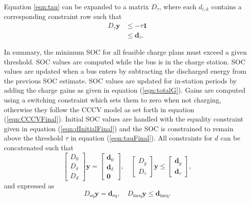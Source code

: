 Equation \eqref{eqn:tau} can be expanded to a matrix $D_\tau$, where each $d_{i,k}$ contains a corresponding constraint row such that
\begin{equation}\label{eqn:tauFinal}
	\begin{aligned}
		D_\tau\mathbf{y} & \le -\tau\mathbf{1} \\
		       & \le \mathbf{d}_\tau.
	\end{aligned}
\end{equation}
\par In summary, the minimum SOC for all feasible charge plans must exceed a given threshold.  SOC values are computed while the bus is in
the charge station.  SOC values are updated when a bus enters by
subtracting the discharged energy from the previous SOC estimate. SOC
values are updated for in-station periods by adding the charge gains
as given in equation (\ref{eqn:totalG}).  Gains are computed using a
switching constraint which sets them to zero when not charging,
otherwise they follow the CCCV model as set forth in equation
(\ref{eqn:CCCVFinal}). Initial SOC values are handled with the equality
constraint given in equation (\ref{eqn:dInitialFinal}) and the SOC is
constrained to remain above the threshold $\tau$ in equation
(\ref{eqn:tauFinal}). All constraints for $d$ can be concatenated such
that
\begin{equation}
	\begin{bmatrix}
	D_0 \\
	D_\delta \\
	D_d
	\end{bmatrix} \mathbf{y} = 
	\begin{bmatrix}
		\mathbf{d}_0 \\
		\mathbf{d}_\delta \\
		\mathbf{0}
		\end{bmatrix}, \quad \begin{bmatrix} D_g \\ D_\tau \end{bmatrix}\mathbf{y} \le \begin{bmatrix} \mathbf{d}_g \\ \mathbf{d}_\tau \end{bmatrix},
\end{equation}
and expressed as 
	\begin{equation}\label{eqn:cSocFinal}
	D_{\text{eq}}\mathbf{y} = \mathbf{d}_{\text{eq}}, \quad D_{\text{ineq}} \mathbf{y} \le \mathbf{d}_{\text{ineq}}.
\end{equation}
